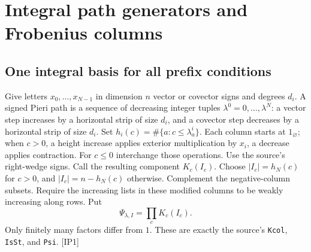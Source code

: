 \section{Integral path generators and Frobenius columns}
\label{sec:path-generators}


\subsection{One integral basis for all prefix conditions}

Give letters $x_0,\ldots,x_{N-1}$ in dimension $n$ vector or covector signs and degrees $d_i$. A signed Pieri path is a sequence of decreasing integer tuples $\lambda^0=0,\ldots,\lambda^N$: a vector step increases by a horizontal strip of size $d_i$, and a covector step decreases by a horizontal strip of size $d_i$. Set $h_i(c)=\#\{a:c\le\lambda^i_a\}$. Each column starts at $1_{\varnothing}$; when $c>0$, a height increase applies exterior multiplication by $x_i$, a decrease applies contraction. For $c\le0$ interchange those operations. Use the source's right-wedge signs. Call the resulting component $K_c(I_c)$. Choose $|I_c|=h_N(c)$ for $c>0$, and $|I_c|=n-h_N(c)$ otherwise. Complement the negative-column subsets. Require the increasing lists in these modified columns to be weakly increasing along rows. Put
\[
 \Psi_{\lambda,I}=\prod_cK_c(I_c).
 \tag{IP.1}
\]
Only finitely many factors differ from $1$. These are exactly the source's \texttt{Kcol}, \texttt{IsSt}, and \texttt{Psi}. \textsf{[IP1]}

